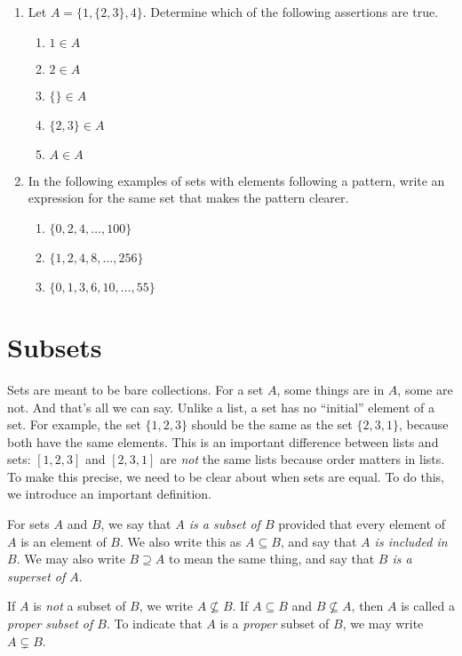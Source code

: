 \begin{exercises}
	\begin{enumerate}
  \item Let $A = \{1,\{2,3\},4\}$. Determine which of the following assertions are true.
    \begin{enumerate}
    \item $1\in A$
    \item $2\in A$
    \item $\{\}\in A$
    \item $\{2,3\}\in A$
    \item $A\in A$
    \end{enumerate}
  \item In the following examples of sets with elements following a pattern, write an expression for the same set
  that makes the pattern clearer.
  \begin{enumerate}
  \item $\{0,2,4,\ldots, 100\}$
  \item $\{1,2,4,8,\ldots, 256\}$
  \item $\{0,1,3, 6, 10,\ldots, 55\}$
  \end{enumerate}
  \end{enumerate}
\end{exercises}

\section*{Subsets}

Sets are meant to be bare collections. For a set $A$, some things are in $A$, some are not. And that's all we can say.
Unlike a list, a set has no ``initial'' element of a set.
For example, the set $\{1,2,3\}$ should be the same as the set $\{2,3,1\}$, because both have the same elements. This is an important difference between
lists and sets: $[1,2,3]$ and $[2,3,1]$ are \emph{not} the same lists because order matters in lists. 
To make this precise, we need to be clear about when sets are equal. To do this, we introduce an important definition.

\begin{defn}
  For sets $A$ and $B$, we say that \emph{$A$ is a subset of $B$} provided that every element of $A$ is an element of $B$. We also
  write this as $A\subseteq B$, and say that \emph{$A$ is included in $B$}.  We may also write $B\supseteq A$ 
  to mean the same thing, and say that \emph{$B$ is a superset of $A$}.

  If $A$ is \emph{not} a subset of $B$, we write $A\not\subseteq B$. If $A\subseteq B$ and $B\not\subseteq A$, then $A$ is called a
  \emph{proper subset of $B$}. To indicate that $A$ is a \emph{proper} subset of $B$, we may write $A\subsetneq B$.
\end{defn}

